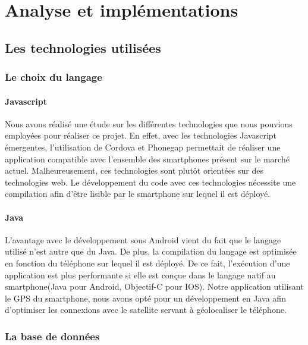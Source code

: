 \part{Analyse et implémentations}
\chapter{Les technologies utilisées}
\section{Le choix du langage}
\subsection{Javascript}
Nous avons réalisé une étude sur les différentes technologies que nous pouvions employées pour réaliser ce projet. En effet, avec les technologies Javascript émergentes, l'utilisation de Cordova et Phonegap permettait de réaliser une application compatible avec l'ensemble des smartphones présent sur le marché actuel. Malheureusement, ces technologies sont plutôt orientées sur des technologies web. Le développement du code avec ces technologies nécessite une compilation afin d'être lisible par le smartphone sur lequel il est déployé. 
\subsection{Java}
L'avantage avec le développement sous Android vient du fait que le langage utilisé n'est autre que du Java. De plus, la compilation du langage est optimisée en fonction du téléphone sur lequel il est déployé. De ce fait, l’exécution d'une application est plus performante si elle est conçue dans le langage natif au smartphone(Java pour Android, Objectif-C pour IOS). Notre application utilisant le GPS du smartphone, nous avons opté pour un développement en Java afin d'optimiser les connexions avec le satellite servant à géolocaliser le téléphone.
\section{La base de données}
